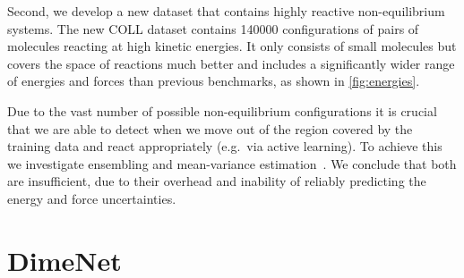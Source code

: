 \documentclass{article}
\begin{document}
Second, we develop a new dataset that contains highly reactive non-equilibrium systems. The new \textsc{COLL} dataset contains \num{140000} configurations of pairs of molecules reacting at high kinetic energies. It only consists of small molecules but covers the space of reactions much better and includes a significantly wider range of energies and forces than previous benchmarks, as shown in \cref{fig:energies}.

Due to the vast number of possible non-equilibrium configurations it is crucial that we are able to detect when we move out of the region covered by the training data and react appropriately (e.g.\ via active learning). To achieve this we investigate ensembling \cite{hansen_neural_1990} and mean-variance estimation~\cite{nix_estimating_1994}. We conclude that both are insufficient, due to their overhead and inability of reliably predicting the energy and force uncertainties.

\section{DimeNet}
\end{document}

